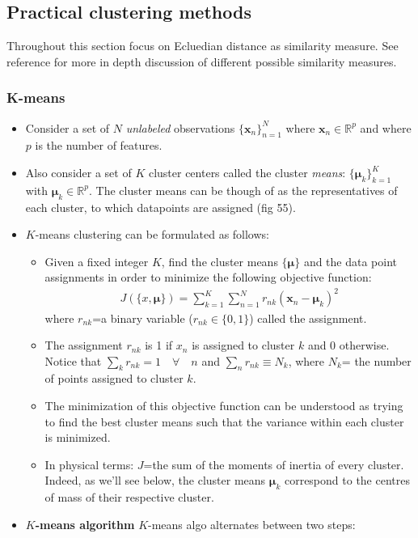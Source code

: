 \documentclass[norsk,a4paper,11pt]{article}
\begin{document}
\subsection{Practical clustering methods}
Throughout this section focus on Ecluedian distance as similarity measure. See reference for more in depth discussion of different possible similarity measures.
\subsubsection{K-means}
\begin{itemize}
	\item Consider a set of $N$ \textit{unlabeled} observations $\{ \bm{x}_n \}_{n=1}^N$ where $\bm{x}_n \in \mathbb{R}^p$ and where $p$ is the number of features. 
	\item Also consider a set of $K$ cluster centers called the cluster \textit{means}: $\{ \bm{\mu}_k \}_{k=1}^K$ with $\bm{\mu}_k \in \mathbb{R}^p$. The cluster means can be though of as the representatives of each cluster, to which datapoints are assigned (fig 55). 
	\item $K$-means clustering can be formulated as follows:
	\begin{itemize}
		\item Given a fixed integer $K$, find the cluster means $\{\bm{\mu} \}$ and the data point assignments in order to minimize the following objective function:
		\begin{align}
			J(\{ x, \bm{\mu} \}) = \sum_{k=1}^K \sum_{n=1}^N r_{nk} (\bm{x}_n - \bm{\mu}_k)^2
		\end{align}
		where $r_{nk}$=a binary variable ($r_{nk} \in \{ 0,1 \}$) called the assignment.
		\item The assignment $r_{nk}$ is 1 if $x_{n}$ is assigned to cluster $k$ and 0 otherwise. Notice that $\sum_k r_{nk} = 1 \quad \forall \quad n$ and $\sum_n r_{nk} \equiv N_k$, where $N_k$= the number of points assigned to cluster $k$.
		\item The minimization of this objective function can be understood as trying to find the best cluster means such that the variance within each cluster is minimized. 
		\item In physical terms: $J$=the sum of the moments of inertia of every cluster. Indeed, as we'll see below, the cluster means $\bm{\mu}_k$ correspond to the centres of mass of their respective cluster.
	\end{itemize} 
	\item $K$\textbf{-means algorithm} $K$-means algo alternates between two steps:

\end{itemize}
\end{document}
